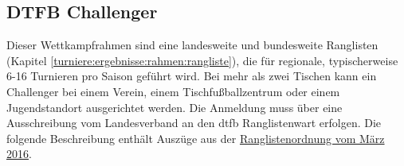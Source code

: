 \subsection{DTFB Challenger}
\label{turniere:beispiele:challenger}

Dieser Wettkampfrahmen sind eine landesweite und bundesweite Ranglisten (Kapitel \ref{turniere:ergebnisse:rahmen:rangliste}), die für regionale, typischerweise 6-16 Turnieren pro Saison geführt wird.
Bei mehr als zwei Tischen kann ein Challenger bei  einem Verein, einem Tischfußballzentrum oder einem Jugendstandort  ausgerichtet werden. Die Anmeldung muss über eine Ausschreibung vom Landesverband an den \gls{dtfb} Ranglistenwart erfolgen. Die folgende Beschreibung enthält Auszüge aus der \href{http://dtfb.de/images/Ranglistenturnierordnung_des_DTFB_Version_2016_1.pdf} {Ranglistenordnung vom März 2016}. 

